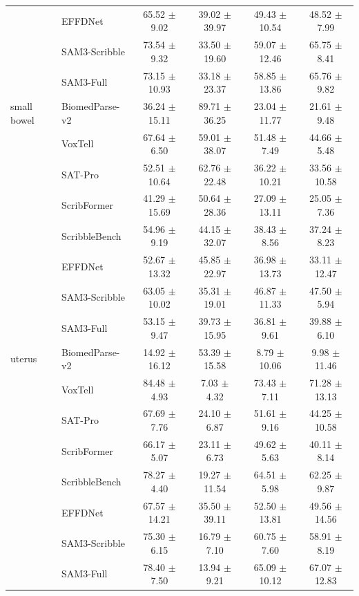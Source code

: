 \documentclass[preprint,12pt]{elsarticle}
\begin{document}
\begin{table}[!p]
{\begin{tabular}{l l c c c c}
 & EFFDNet & 65.52 $\pm$ 9.02 & 39.02 $\pm$ 39.97 & 49.43 $\pm$ 10.54 & 48.52 $\pm$ 7.99 \\
 & SAM3-Scribble & 73.54 $\pm$ 9.32 & 33.50 $\pm$ 19.60 & 59.07 $\pm$ 12.46 & 65.75 $\pm$ 8.41 \\
 & SAM3-Full & 73.15 $\pm$ 10.93 & 33.18 $\pm$ 23.37 & 58.85 $\pm$ 13.86 & 65.76 $\pm$ 9.82 \\
small bowel & BiomedParse-v2 & \cellcolor{gray!20}36.24 $\pm$ 15.11 & \cellcolor{gray!20}89.71 $\pm$ 36.25 & \cellcolor{gray!20}23.04 $\pm$ 11.77 & \cellcolor{gray!20}21.61 $\pm$ 9.48 \\
 & VoxTell & \cellcolor{gray!20}67.64 $\pm$ 6.50 & \cellcolor{gray!20}59.01 $\pm$ 38.07 & \cellcolor{gray!20}51.48 $\pm$ 7.49 & \cellcolor{gray!20}44.66 $\pm$ 5.48 \\
 & SAT-Pro & 52.51 $\pm$ 10.64 & 62.76 $\pm$ 22.48 & 36.22 $\pm$ 10.21 & 33.56 $\pm$ 10.58 \\
 & ScribFormer & 41.29 $\pm$ 15.69 & 50.64 $\pm$ 28.36 & 27.09 $\pm$ 13.11 & 25.05 $\pm$ 7.36 \\
 & ScribbleBench & 54.96 $\pm$ 9.19 & 44.15 $\pm$ 32.07 & 38.43 $\pm$ 8.56 & 37.24 $\pm$ 8.23 \\
 & EFFDNet & 52.67 $\pm$ 13.32 & 45.85 $\pm$ 22.97 & 36.98 $\pm$ 13.73 & 33.11 $\pm$ 12.47 \\
 & SAM3-Scribble & 63.05 $\pm$ 10.02 & 35.31 $\pm$ 19.01 & 46.87 $\pm$ 11.33 & 47.50 $\pm$ 5.94 \\
 & SAM3-Full & 53.15 $\pm$ 9.47 & 39.73 $\pm$ 15.95 & 36.81 $\pm$ 9.61 & 39.88 $\pm$ 6.10 \\
uterus & BiomedParse-v2 & \cellcolor{gray!20}14.92 $\pm$ 16.12 & \cellcolor{gray!20}53.39 $\pm$ 15.58 & \cellcolor{gray!20}8.79 $\pm$ 10.06 & \cellcolor{gray!20}9.98 $\pm$ 11.46 \\
 & VoxTell & \cellcolor{gray!20}84.48 $\pm$ 4.93 & \cellcolor{gray!20}7.03 $\pm$ 4.32 & \cellcolor{gray!20}73.43 $\pm$ 7.11 & \cellcolor{gray!20}71.28 $\pm$ 13.13 \\
 & SAT-Pro & 67.69 $\pm$ 7.76 & 24.10 $\pm$ 6.87 & 51.61 $\pm$ 9.16 & 44.25 $\pm$ 10.58 \\
 & ScribFormer & 66.17 $\pm$ 5.07 & 23.11 $\pm$ 6.73 & 49.62 $\pm$ 5.63 & 40.11 $\pm$ 8.14 \\
 & ScribbleBench & 78.27 $\pm$ 4.40 & 19.27 $\pm$ 11.54 & 64.51 $\pm$ 5.98 & 62.25 $\pm$ 9.87 \\
 & EFFDNet & 67.57 $\pm$ 14.21 & 35.50 $\pm$ 39.11 & 52.50 $\pm$ 13.81 & 49.56 $\pm$ 14.56 \\
 & SAM3-Scribble & 75.30 $\pm$ 6.15 & 16.79 $\pm$ 7.10 & 60.75 $\pm$ 7.60 & 58.91 $\pm$ 8.19 \\
 & SAM3-Full & 78.40 $\pm$ 7.50 & 13.94 $\pm$ 9.21 & 65.09 $\pm$ 10.12 & 67.07 $\pm$ 12.83 \\
\bottomrule
\end{tabular}%
}
\end{table}
\end{document}
